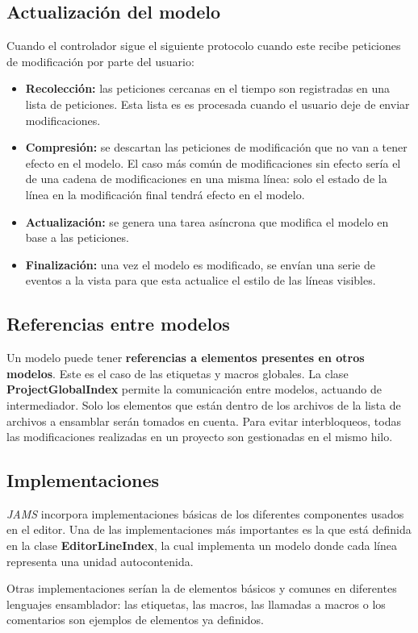 \subsection{Actualización del modelo}\label{subsec:actualizacion-del-modelo}

Cuando el controlador sigue el siguiente
protocolo cuando este recibe peticiones de modificación
por parte del usuario:
\begin{itemize}
    \item \textbf{Recolección:} las peticiones cercanas
    en el tiempo son registradas en una lista de peticiones.
    Esta lista es es procesada cuando el usuario deje
    de enviar modificaciones.
    \item \textbf{Compresión:} se descartan las peticiones
    de modificación que no van a tener efecto en el modelo.
    El caso más común de modificaciones sin efecto sería
    el de una cadena de modificaciones en una misma línea:
    solo el estado de la línea en la modificación final
    tendrá efecto en el modelo.
    \item \textbf{Actualización:} se genera una tarea
    asíncrona que modifica el modelo en base a las
    peticiones.
    \item \textbf{Finalización:} una vez el modelo
    es modificado, se envían una serie de eventos
    a la vista para que esta actualice el estilo
    de las líneas visibles.
\end{itemize}

\subsection{Referencias entre modelos}\label{subsec:referencias-entre-modelos}

Un modelo puede tener \textbf{referencias a elementos
presentes en otros modelos}.
Este es el caso de las etiquetas y macros globales.
La clase \textbf{ProjectGlobalIndex} permite la
comunicación entre modelos, actuando de intermediador.
Solo los elementos que están dentro de los archivos
de la lista de archivos a ensamblar serán tomados en cuenta.
Para evitar interbloqueos, todas las modificaciones
realizadas en un proyecto son gestionadas en el
mismo hilo.


\subsection{Implementaciones}\label{subsec:implementaciones}

\textit{JAMS} incorpora implementaciones básicas de los
diferentes componentes usados en el editor.
Una de las implementaciones más importantes es la que está
definida en la clase \textbf{EditorLineIndex}, la cual
implementa un modelo donde cada línea representa una
unidad autocontenida.

\noindent Otras implementaciones serían la de elementos
básicos y comunes en diferentes lenguajes ensamblador:
las etiquetas, las macros, las llamadas a macros o
los comentarios son ejemplos de elementos ya definidos.